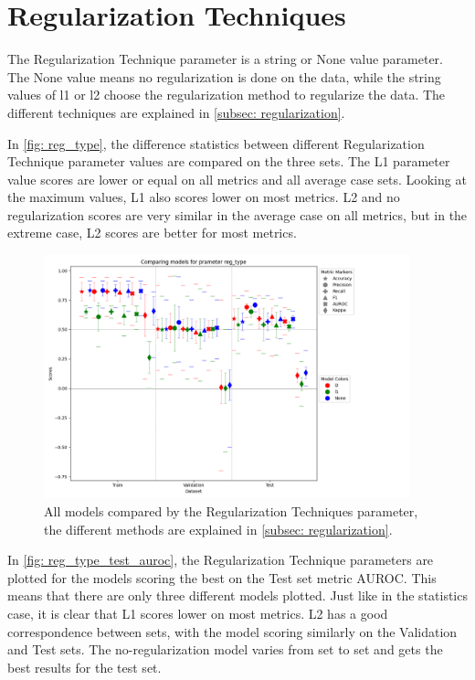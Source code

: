 \section{Regularization Techniques}
The Regularization Technique parameter is a string or None value parameter. The None value means no regularization is done on the data, while the string values of l1 or l2 choose the regularization method to regularize the data. The different techniques are explained in \autoref{subsec: regularization}.

In \autoref{fig: reg_type}, the difference statistics between different Regularization Technique parameter values are compared on the three sets. The L1 parameter value scores are lower or equal on all metrics and all average case sets. Looking at the maximum values, L1 also scores lower on most metrics. L2 and no regularization scores are very similar in the average case on all metrics, but in the extreme case, L2 scores are better for most metrics.

\begin{figure}[H]
    \centering
    \includegraphics[width=400px]{Figures/results/reg_type/reg_type.png}
    \caption{All models compared by the Regularization Techniques parameter, the different methods are explained in \autoref{subsec: regularization}.}
    \label{fig: reg_type}
\end{figure}

In \autoref{fig: reg_type_test_auroc}, the Regularization Technique parameters are plotted for the models scoring the best on the Test set metric AUROC. This means that there are only three different models plotted. Just like in the statistics case, it is clear that L1 scores lower on most metrics. L2 has a good correspondence between sets, with the model scoring similarly on the Validation and Test sets. The no-regularization model varies from set to set and gets the best results for the test set.

